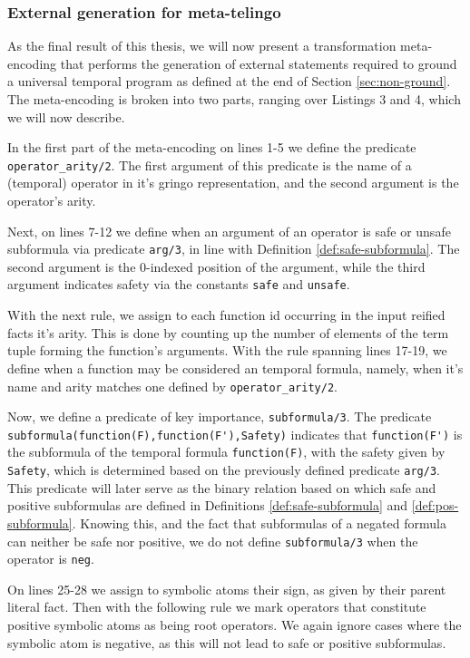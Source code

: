 \subsubsection{External generation for meta-telingo}

As the final result of this thesis, we will now present a
transformation meta-encoding that performs the generation of external
statements required to ground a universal temporal program as defined
at the end of Section \ref{sec:non-ground}. The meta-encoding is
broken into two parts, ranging over Listings 3 and 4, which we will
now describe.

In the first part of the meta-encoding on lines 1-5 we define the
predicate \verb|operator_arity/2|. The first argument of this
predicate is the name of a (temporal) operator in it's gringo
representation, and the second argument is the operator's arity.

Next, on lines 7-12 we define when an argument of an operator is safe
or unsafe subformula via predicate \verb|arg/3|, in line with
Definition \ref{def:safe-subformula}. The second argument is the
0-indexed position of the argument, while the third argument indicates
safety via the constants \verb|safe| and \verb|unsafe|.

With the next rule, we assign to each function id occurring in the
input reified facts it's arity. This is done by counting up the number
of elements of the term tuple forming the function's arguments. With
the rule spanning lines 17-19, we define when a function may be
considered an temporal formula, namely, when it's name and arity matches one
defined by \verb|operator_arity/2|.

Now, we define a predicate of key importance, \verb|subformula/3|. The
predicate \verb|subformula(function(F),function(F'),Safety)| indicates
that \verb|function(F')| is the subformula of the temporal formula
\verb|function(F)|, with the safety given by \verb|Safety|, which is
determined based on the previously defined predicate
\verb|arg/3|. This predicate will later serve as the binary relation
based on which safe and positive subformulas are defined in
Definitions \ref{def:safe-subformula} and
\ref{def:pos-subformula}. Knowing this, and the fact that subformulas
of a negated formula can neither be safe nor positive, we do not
define \verb|subformula/3| when the operator is \verb|neg|.

On lines 25-28 we assign to symbolic atoms their sign, as given by
their parent literal fact. Then with the following rule we mark
operators that constitute positive symbolic atoms as being root
operators. We again ignore cases where the symbolic atom is negative,
as this will not lead to safe or positive subformulas.

